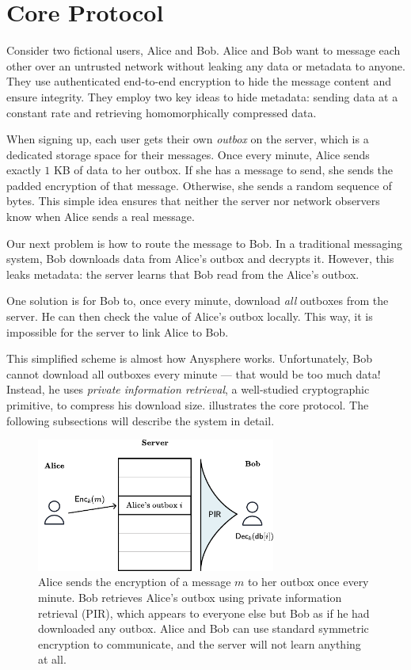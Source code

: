 \section{Core Protocol}
\label{sec:coreprotocol}

Consider two fictional users, Alice and Bob. Alice and Bob want to message each other over an untrusted network without leaking any data or metadata to anyone. They use authenticated end-to-end encryption to hide the message content and ensure integrity. They employ two key ideas to hide metadata: sending data at a constant rate and retrieving homomorphically compressed data.

When signing up, each user gets their own \textit{outbox} on the server, which is a dedicated storage space for their messages. Once every minute, Alice sends exactly $1$ KB of data to her outbox. If she has a message to send, she sends the padded encryption of that message. Otherwise, she sends a random sequence of bytes. This simple idea ensures that neither the server nor network observers know when Alice sends a real message.

Our next problem is how to route the message to Bob. In a traditional messaging system, Bob downloads data from Alice's outbox and decrypts it. However, this leaks metadata: the server learns that Bob read from the Alice's outbox.

One solution is for Bob to, once every minute, download \textit{all} outboxes from the server. He can then check the value of Alice's outbox locally. This way, it is impossible for the server to link Alice to Bob.

This simplified scheme is almost how Anysphere works. Unfortunately, Bob cannot download all outboxes every minute — that would be too much data! Instead, he uses \textit{private information retrieval}, a well-studied cryptographic primitive, to compress his download size.  illustrates the core protocol. The following subsections will describe the system in detail.

\begin{figure}
    \centering
    \includegraphics[width=0.7\textwidth]{pirfigure.pdf}
\caption{Alice sends the encryption of a message $m$ to her outbox once every minute. Bob retrieves Alice's outbox using private information retrieval (PIR), which appears to everyone else but Bob as if he had downloaded any outbox. Alice and Bob can use standard symmetric encryption to communicate, and the server will not learn anything at all.}
\label{fig:highlevelpir}
\end{figure}


